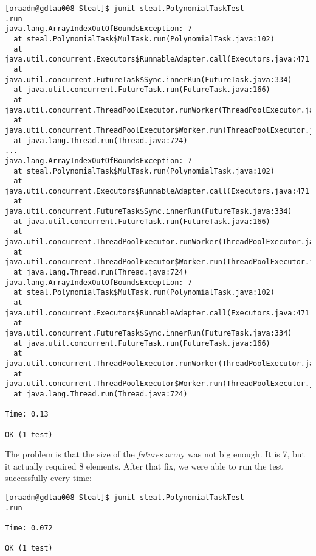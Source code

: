 \begin{verbatim}
[oraadm@gdlaa008 Steal]$ junit steal.PolynomialTaskTest
.run
java.lang.ArrayIndexOutOfBoundsException: 7
  at steal.PolynomialTask$MulTask.run(PolynomialTask.java:102)
  at java.util.concurrent.Executors$RunnableAdapter.call(Executors.java:471)
  at java.util.concurrent.FutureTask$Sync.innerRun(FutureTask.java:334)
  at java.util.concurrent.FutureTask.run(FutureTask.java:166)
  at
java.util.concurrent.ThreadPoolExecutor.runWorker(ThreadPoolExecutor.java:1145)
  at
java.util.concurrent.ThreadPoolExecutor$Worker.run(ThreadPoolExecutor.java:615)
  at java.lang.Thread.run(Thread.java:724)
...
java.lang.ArrayIndexOutOfBoundsException: 7
  at steal.PolynomialTask$MulTask.run(PolynomialTask.java:102)
  at java.util.concurrent.Executors$RunnableAdapter.call(Executors.java:471)
  at java.util.concurrent.FutureTask$Sync.innerRun(FutureTask.java:334)
  at java.util.concurrent.FutureTask.run(FutureTask.java:166)
  at
java.util.concurrent.ThreadPoolExecutor.runWorker(ThreadPoolExecutor.java:1145)
  at
java.util.concurrent.ThreadPoolExecutor$Worker.run(ThreadPoolExecutor.java:615)
  at java.lang.Thread.run(Thread.java:724)
java.lang.ArrayIndexOutOfBoundsException: 7
  at steal.PolynomialTask$MulTask.run(PolynomialTask.java:102)
  at java.util.concurrent.Executors$RunnableAdapter.call(Executors.java:471)
  at java.util.concurrent.FutureTask$Sync.innerRun(FutureTask.java:334)
  at java.util.concurrent.FutureTask.run(FutureTask.java:166)
  at
java.util.concurrent.ThreadPoolExecutor.runWorker(ThreadPoolExecutor.java:1145)
  at
java.util.concurrent.ThreadPoolExecutor$Worker.run(ThreadPoolExecutor.java:615)
  at java.lang.Thread.run(Thread.java:724)

Time: 0.13

OK (1 test)
\end{verbatim}
\hfill
\par
The problem is that the size of the \textit{futures} array was not big enough.
It is 7, but it actually required 8 elements. After that fix, we were able to
run the test successfully every time:
\par
\hfill
\begin{verbatim}
[oraadm@gdlaa008 Steal]$ junit steal.PolynomialTaskTest
.run

Time: 0.072

OK (1 test)
\end{verbatim}
\hfill
\par
